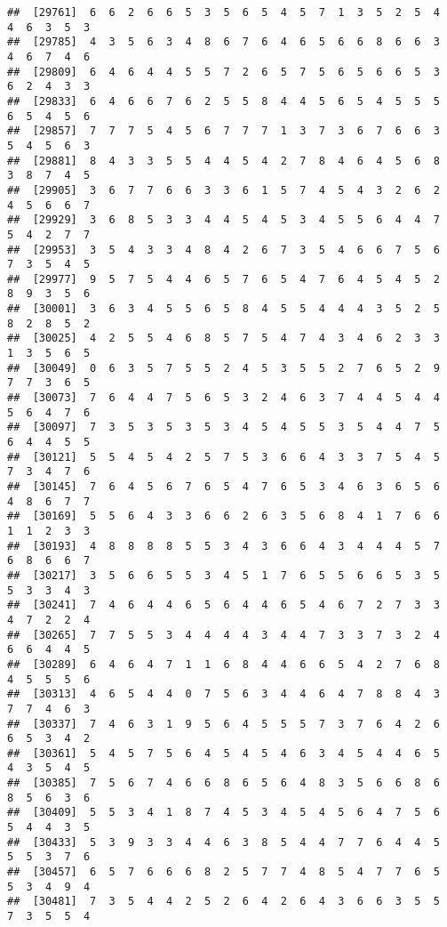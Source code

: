 \documentclass[
]{book}
\begin{document}
\begin{verbatim}
##  [29761]  6  6  2  6  6  5  3  5  6  5  4  5  7  1  3  5  2  5  4  4  6  3  5  3
##  [29785]  4  3  5  6  3  4  8  6  7  6  4  6  5  6  6  8  6  6  3  4  6  7  4  6
##  [29809]  6  4  6  4  4  5  5  7  2  6  5  7  5  6  5  6  6  5  3  6  2  4  3  3
##  [29833]  6  4  6  6  7  6  2  5  5  8  4  4  5  6  5  4  5  5  5  6  5  4  5  6
##  [29857]  7  7  7  5  4  5  6  7  7  7  1  3  7  3  6  7  6  6  3  5  4  5  6  3
##  [29881]  8  4  3  3  5  5  4  4  5  4  2  7  8  4  6  4  5  6  8  3  8  7  4  5
##  [29905]  3  6  7  7  6  6  3  3  6  1  5  7  4  5  4  3  2  6  2  4  5  6  6  7
##  [29929]  3  6  8  5  3  3  4  4  5  4  5  3  4  5  5  6  4  4  7  5  4  2  7  7
##  [29953]  3  5  4  3  3  4  8  4  2  6  7  3  5  4  6  6  7  5  6  7  3  5  4  5
##  [29977]  9  5  7  5  4  4  6  5  7  6  5  4  7  6  4  5  4  5  2  8  9  3  5  6
##  [30001]  3  6  3  4  5  5  6  5  8  4  5  5  4  4  4  3  5  2  5  8  2  8  5  2
##  [30025]  4  2  5  5  4  6  8  5  7  5  4  7  4  3  4  6  2  3  3  1  3  5  6  5
##  [30049]  0  6  3  5  7  5  5  2  4  5  3  5  5  2  7  6  5  2  9  7  7  3  6  5
##  [30073]  7  6  4  4  7  5  6  5  3  2  4  6  3  7  4  4  5  4  4  5  6  4  7  6
##  [30097]  7  3  5  3  5  3  5  3  4  5  4  5  5  3  5  4  4  7  5  6  4  4  5  5
##  [30121]  5  5  4  5  4  2  5  7  5  3  6  6  4  3  3  7  5  4  5  7  3  4  7  6
##  [30145]  7  6  4  5  6  7  6  5  4  7  6  5  3  4  6  3  6  5  6  4  8  6  7  7
##  [30169]  5  5  6  4  3  3  6  6  2  6  3  5  6  8  4  1  7  6  6  1  1  2  3  3
##  [30193]  4  8  8  8  8  5  5  3  4  3  6  6  4  3  4  4  4  5  7  6  8  6  6  7
##  [30217]  3  5  6  6  5  5  3  4  5  1  7  6  5  5  6  6  5  3  5  5  3  3  4  3
##  [30241]  7  4  6  4  4  6  5  6  4  4  6  5  4  6  7  2  7  3  3  4  7  2  2  4
##  [30265]  7  7  5  5  3  4  4  4  4  3  4  4  7  3  3  7  3  2  4  6  6  4  4  5
##  [30289]  6  4  6  4  7  1  1  6  8  4  4  6  6  5  4  2  7  6  8  4  5  5  5  6
##  [30313]  4  6  5  4  4  0  7  5  6  3  4  4  6  4  7  8  8  4  3  7  7  4  6  3
##  [30337]  7  4  6  3  1  9  5  6  4  5  5  5  7  3  7  6  4  2  6  6  5  3  4  2
##  [30361]  5  4  5  7  5  6  4  5  4  5  4  6  3  4  5  4  4  6  5  4  3  5  4  5
##  [30385]  7  5  6  7  4  6  6  8  6  5  6  4  8  3  5  6  6  8  6  8  5  6  3  6
##  [30409]  5  5  3  4  1  8  7  4  5  3  4  5  4  5  6  4  7  5  6  5  4  4  3  5
##  [30433]  5  3  9  3  3  4  4  6  3  8  5  4  4  7  7  6  4  4  5  5  5  3  7  6
##  [30457]  6  5  7  6  6  6  8  2  5  7  7  4  8  5  4  7  7  6  5  5  3  4  9  4
##  [30481]  7  3  5  4  4  2  5  2  6  4  2  6  4  3  6  6  3  5  5  7  3  5  5  4

\end{verbatim}
\end{document}
